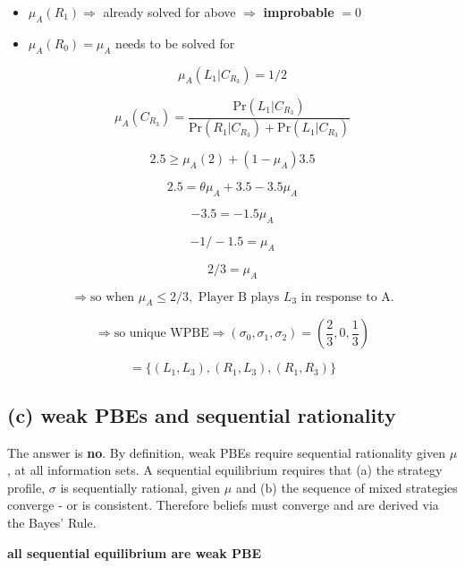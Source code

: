 \documentclass{article}
\begin{document}
\begin{itemize}
    \item $\mu_A(R_1) \Rightarrow$ already solved for above $\Rightarrow$ \textbf{improbable} $= 0$
    \item $\mu_A(R_0) = \mu_A$ needs to be solved for
\end{itemize}

\[
\mu_A(L_1 | C_{R_3}) = 1/2
\]

\[
\mu_A(C_{R_3}) = \frac{\text{Pr}(L_1 | C_{R_3})}{\text{Pr}(R_1 | C_{R_3}) + \text{Pr}(L_1 | C_{R_3})}
\]

\[
2.5 \geq \mu_A(2) + (1 - \mu_A)3.5
\]

\[
2.5 = \theta \mu_A + 3.5 - 3.5\mu_A
\]

\[
-3.5 = -1.5\mu_A
\]

\[
-1 / -1.5 = \mu_A
\]

\[
2/3 = \mu_A
\]

\[
\Rightarrow \text{so when } \mu_A \leq 2/3, \text{ Player B plays } L_3 \text{ in response to A.}
\]

\[
\Rightarrow \text{so unique WPBE} \Rightarrow (\sigma_0, \sigma_1, \sigma_2) = \left( \frac{2}{3}, 0, \frac{1}{3} \right)
\]

\[
= \{(L_1, L_3), (R_1, L_3), (R_1, R_3)\}
\]

\subsection*{(c) weak PBEs and sequential rationality}

The answer is \textbf{no}. By definition, weak PBEs require sequential rationality given $\mu$, at all information sets. A sequential equilibrium requires that (a) the strategy profile, $\sigma$ is sequentially rational, given $\mu$ and (b) the sequence of mixed strategies converge - or is consistent. Therefore beliefs must converge and are derived via the Bayes' Rule.  
\vspace{2mm}
\begin{center}
    \textbf{all sequential equilibrium are weak PBE}
\end{center}
\end{document}
